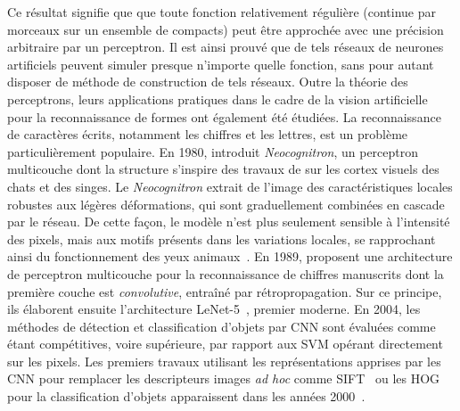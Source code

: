 Ce résultat signifie que que toute fonction relativement régulière (continue par morceaux sur un ensemble de compacts) peut être approchée avec une précision arbitraire par un perceptron. Il est ainsi prouvé que de tels réseaux de neurones artificiels peuvent simuler presque n'importe quelle fonction, sans pour autant disposer de méthode de construction de tels réseaux. Outre la théorie des perceptrons, leurs applications pratiques dans le cadre de la vision artificielle pour la reconnaissance de formes ont également été étudiées. La reconnaissance de caractères écrits, notamment les chiffres et les lettres, est un problème particulièrement populaire. En 1980, \citet{fukushima_neocognitron_1980} introduit \emph{Neocognitron}, un perceptron multicouche dont la structure s'inspire des travaux de \citet{hubel_receptive_1959,hubel_receptive_1968} sur les cortex visuels des chats et des singes. Le \emph{Neocognitron} extrait de l'image des caractéristiques locales robustes aux légères déformations, qui sont graduellement combinées en cascade par le réseau. De cette façon, le modèle n'est plus seulement sensible à l'intensité des pixels, mais aux motifs présents dans les variations locales, se rapprochant ainsi du fonctionnement des yeux animaux~\cite{lettvin_what_1959}. En 1989, \citet{lecun_backpropagation_1989} proposent une architecture de perceptron multicouche pour la reconnaissance de chiffres manuscrits dont la première couche est \emph{convolutive}, entraîné par rétropropagation. Sur ce principe, ils élaborent ensuite l'architecture LeNet-5~\cite{lecun_gradient-based_1998}, premier  moderne. En 2004, les méthodes de détection et classification d'objets par \gls{CNN} sont évaluées comme étant compétitives, voire supérieure, par rapport aux \gls{SVM} opérant directement sur les pixels. Les premiers travaux utilisant les représentations apprises par les \gls{CNN} pour remplacer les descripteurs images \emph{ad hoc} comme \gls{SIFT}~\cite{lowe_object_1999} ou les \gls{HOG}~\cite{dalal_histograms_2005} pour la classification d'objets apparaissent dans les années 2000~\cite{serre_object_2005,huang_large-scale_2006}.

